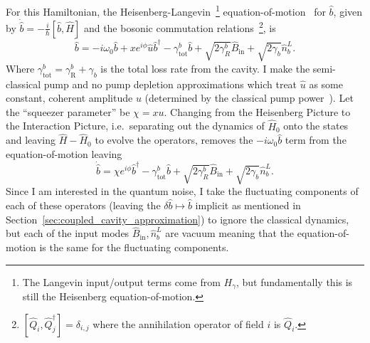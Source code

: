 For this Hamiltonian, the Heisenberg-Langevin~\footnote{The Langevin input/output terms come from $H_\gamma$, but fundamentally this is still the Heisenberg equation-of-motion.} equation-of-motion~\cite{} for $\hat b$, given by $\dot{\hat b}=-\frac{i}{\hbar}[\hat b,\hat H]$ and the bosonic commutation relations~\footnote{$[\hat Q_i,\hat Q_j^\dag]=\delta_{i,j}$ where the annihilation operator of field $i$ is $\hat Q_i$.}, is 
\begin{equation}
\dot{\hat{b}}= -i\omega_0 \hat b+x e^{i\phi} \hat u\hat b^\dag - \gamma^b_\mathrm{tot} \hat{b} + \sqrt{2\gamma^b_R}\hat{B}_\mathrm{in} + \sqrt{2\gamma_b}\hat{n}^L_b.
\end{equation}
Where $\gamma^b_\text{tot}=\gamma^b_\text{R}+\gamma_b$ is the total loss rate from the cavity. I make the semi-classical pump and no pump depletion approximations which treat $\hat u$ as some constant, coherent amplitude $u$ (determined by the classical pump power~\cite{}). Let the ``squeezer parameter'' be $\chi = x u$. Changing from the Heisenberg Picture to the Interaction Picture, i.e.\ separating out the dynamics of $\hat H_0$ onto the states and leaving $\hat H - \hat H_0$ to evolve the operators, removes the $-i\omega_0 \hat b$ term from the equation-of-motion leaving %
\begin{equation}
\label{eq:dOPO_pre_FT}
\dot{\hat{b}}= \chi e^{i\phi}\hat b^\dag - \gamma^b_\mathrm{tot} \hat{b} + \sqrt{2\gamma^b_R}\hat{B}_\mathrm{in} + \sqrt{2\gamma_b}\hat{n}^L_b.
\end{equation}
Since I am interested in the quantum noise, I take the fluctuating components of each of these operators (leaving the $\delta \hat b\mapsto\hat b$ implicit as mentioned in Section~\ref{sec:coupled_cavity_approximation}) to ignore the classical dynamics, but each of the input modes $\hat{B}_\mathrm{in}, \hat{n}^L_b$ are vacuum meaning that the equation-of-motion is the same for the fluctuating components. 

